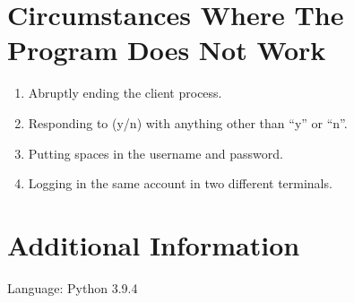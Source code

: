 \documentclass[12pt, ]{article}
\begin{document}
\section{Circumstances Where The Program Does Not Work}

\begin{enumerate}
	\item Abruptly ending the client process.
	\item Responding to (y/n) with anything other than ``y'' or ``n''.
	\item Putting spaces in the username and password.
	\item Logging in the same account in two different terminals.
\end{enumerate}

\section{Additional Information}

\begin{flushleft}
	Language: Python 3.9.4
\end{flushleft}
\end{document}
